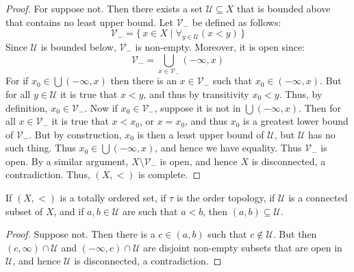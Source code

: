 \documentclass[oneside]{book}                                                  %
\begin{document}
            \begin{proof}
                For suppose not. Then there exists a set
                $\mathcal{U}\subseteq{X}$ that is bounded above that contains
                no least upper bound. Let $\mathcal{V}_{-}$ be defined as
                follows:
                \begin{equation}
                    \mathcal{V}_{-}=\{\,x\in{X}\;|\;
                        \forall_{y\in\mathcal{U}}(x<y)\,\}
                \end{equation}
                Since $\mathcal{U}$ is bounded below, $\mathcal{V}_{-}$ is
                non-empty. Moreover, it is open since:
                \begin{equation}
                    \mathcal{V}_{-}=
                    \bigcup_{x\in\mathcal{V}_{-}}(\minus\infty,x)
                \end{equation}
                For if $x_{0}\in\bigcup(\minus\infty,x)$ then there is an
                $x\in\mathcal{V}_{-}$ such that $x_{0}\in(\minus\infty,x)$. But
                for all $y\in\mathcal{U}$ it is true that $x<y$, and thus by
                transitivity $x_{0}<y$. Thus, by definition,
                $x_{0}\in\mathcal{V}_{-}$. Now if $x_{0}\in\mathcal{V}_{-}$,
                suppose it is not in $\bigcup(\minus\infty,x)$. Then for all
                $x\in\mathcal{V}_{-}$ it is true that $x<x_{0}$, or $x=x_{0}$,
                and thus $x_{0}$ is a greatest lower bound of $\mathcal{V}_{-}$.
                But by construction, $x_{0}$ is then a least upper bound of
                $\mathcal{U}$, but $\mathcal{U}$ has no such thing. Thus
                $x_{0}\in\bigcup(\minus\infty,x)$, and hence we have equality.
                Thus $\mathcal{V}_{-}$ is open. By a similar argument,
                ${X}\setminus\mathcal{V}_{-}$ is open, and hence $X$ is
                disconnected, a contradiction. Thus, $(X,<)$ is complete.
            \end{proof}
            \begin{theorem}
                If $(X,<)$ is a totally ordered set, if $\tau$ is the order
                topology, if $\mathcal{U}$ is a connected subset of $X$, and if
                $a,b\in\mathcal{U}$ are such that $a<b$, then
                $(a,b)\subseteq\mathcal{U}$.
            \end{theorem}
            \begin{proof}
                Suppose not. Then there is a $c\in(a,b)$ such that
                $c\notin\mathcal{U}$. But then $(c,\infty)\cap\mathcal{U}$ and
                $(\minus\infty,c)\cap\mathcal{U}$ are disjoint non-empty subsets
                that are open in $\mathcal{U}$, and hence $\mathcal{U}$ is
                disconnected, a contradiction.
            \end{proof}
\end{document}
